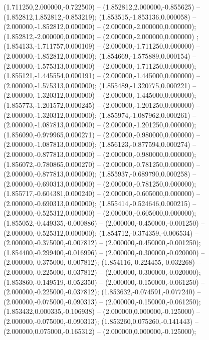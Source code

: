  (1.711250,2.000000,-0.722500) -- (1.852812,2.000000,-0.855625) -- (1.852812,1.852812,-0.853219);
 (1.853515,-1.853136,0.000058) -- (2.000000,-1.852812,0.000000) -- (2.000000,-2.000000,0.000000);
 (1.852812,-2.000000,0.000000) -- (2.000000,-2.000000,0.000000) ;
 (1.854133,-1.711757,0.000109) -- (2.000000,-1.711250,0.000000) -- (2.000000,-1.852812,0.000000);
 (1.854669,-1.575889,0.000154) -- (2.000000,-1.575313,0.000000) -- (2.000000,-1.711250,0.000000);
 (1.855121,-1.445554,0.000191) -- (2.000000,-1.445000,0.000000) -- (2.000000,-1.575313,0.000000);
 (1.855489,-1.320775,0.000221) -- (2.000000,-1.320312,0.000000) -- (2.000000,-1.445000,0.000000);
 (1.855773,-1.201572,0.000245) -- (2.000000,-1.201250,0.000000) -- (2.000000,-1.320312,0.000000);
 (1.855974,-1.087962,0.000261) -- (2.000000,-1.087813,0.000000) -- (2.000000,-1.201250,0.000000);
 (1.856090,-0.979965,0.000271) -- (2.000000,-0.980000,0.000000) -- (2.000000,-1.087813,0.000000);
 (1.856123,-0.877594,0.000274) -- (2.000000,-0.877813,0.000000) -- (2.000000,-0.980000,0.000000);
 (1.856072,-0.780865,0.000270) -- (2.000000,-0.781250,0.000000) -- (2.000000,-0.877813,0.000000);
 (1.855937,-0.689790,0.000258) -- (2.000000,-0.690313,0.000000) -- (2.000000,-0.781250,0.000000);
 (1.855717,-0.604381,0.000240) -- (2.000000,-0.605000,0.000000) -- (2.000000,-0.690313,0.000000);
 (1.855414,-0.524646,0.000215) -- (2.000000,-0.525312,0.000000) -- (2.000000,-0.605000,0.000000);
 (1.855052,-0.449335,-0.000886) -- (2.000000,-0.450000,-0.001250) -- (2.000000,-0.525312,0.000000);
 (1.854712,-0.374359,-0.006534) -- (2.000000,-0.375000,-0.007812) -- (2.000000,-0.450000,-0.001250);
 (1.854400,-0.299400,-0.016996) -- (2.000000,-0.300000,-0.020000) -- (2.000000,-0.375000,-0.007812);
 (1.854116,-0.224455,-0.032268) -- (2.000000,-0.225000,-0.037812) -- (2.000000,-0.300000,-0.020000);
 (1.853860,-0.149519,-0.052350) -- (2.000000,-0.150000,-0.061250) -- (2.000000,-0.225000,-0.037812);
 (1.853632,-0.074591,-0.077240) -- (2.000000,-0.075000,-0.090313) -- (2.000000,-0.150000,-0.061250);
 (1.853432,0.000335,-0.106938) -- (2.000000,0.000000,-0.125000) -- (2.000000,-0.075000,-0.090313);
 (1.853260,0.075260,-0.141443) -- (2.000000,0.075000,-0.165312) -- (2.000000,0.000000,-0.125000);
